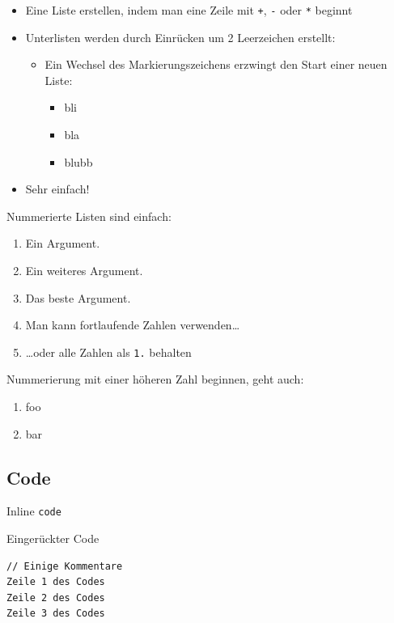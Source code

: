 \documentclass[
  doc]{apa7}
\providecommand{\tightlist}{%
  \setlength{\itemsep}{0pt}\setlength{\parskip}{0pt}}
\begin{document}
\begin{itemize}
\tightlist
\item
  Eine Liste erstellen, indem man eine Zeile mit \texttt{+}, \texttt{-} oder \texttt{*} beginnt
\item
  Unterlisten werden durch Einrücken um 2 Leerzeichen erstellt:

  \begin{itemize}
  \tightlist
  \item
    Ein Wechsel des Markierungszeichens erzwingt den Start einer neuen Liste:

    \begin{itemize}
    \tightlist
    \item
      bli
    \item
      bla
    \item
      blubb
    \end{itemize}
  \end{itemize}
\item
  Sehr einfach!
\end{itemize}

Nummerierte Listen sind einfach:

\begin{enumerate}
\def\labelenumi{\arabic{enumi}.}
\item
  Ein Argument.
\item
  Ein weiteres Argument.
\item
  Das beste Argument.
\item
  Man kann fortlaufende Zahlen verwenden\ldots{}
\item
  \ldots oder alle Zahlen als \texttt{1.} behalten
\end{enumerate}

Nummerierung mit einer höheren Zahl beginnen, geht auch:

\begin{enumerate}
\def\labelenumi{\arabic{enumi}.}
\setcounter{enumi}{56}
\tightlist
\item
  foo
\item
  bar
\end{enumerate}

\hypertarget{code}{%
\subsection{Code}\label{code}}

Inline \texttt{code}

Eingerückter Code

\begin{verbatim}
// Einige Kommentare
Zeile 1 des Codes
Zeile 2 des Codes
Zeile 3 des Codes
\end{verbatim}
\end{document}
